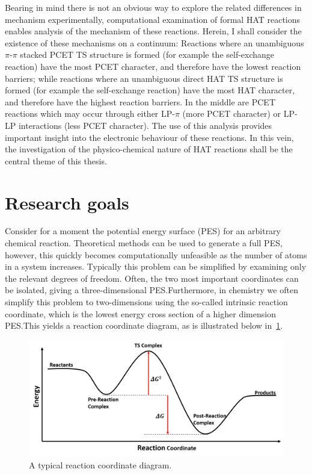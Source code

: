 Bearing in mind there is not an obvious way to explore the related differences
in mechanism experimentally, computational examination of formal HAT reactions
enables analysis of the mechanism of these reactions. Herein, I shall consider
the existence of these mechanisms on a continuum: Reactions where an unambiguous
$\pi$-$\pi$ stacked PCET TS structure is formed (for example the  self-exchange reaction) have the most PCET character, and therefore have
the lowest reaction barriers; while reactions where an unambiguous direct HAT TS
structure is formed (for example the  self-exchange reaction)
have the most HAT character, and therefore have the highest reaction barriers.
In the middle are PCET reactions which may occur through either LP-$\pi$ (more
PCET character) or LP-LP interactions (less PCET character). The use of this
analysis provides important insight into the electronic behaviour of these
reactions. In this vein, the investigation of the physico-chemical nature of HAT
reactions shall be the central theme of this thesis.

\section{Research goals}

Consider for a moment the potential energy surface (PES) for an arbitrary
chemical reaction. Theoretical methods can be used to generate a full PES,
however, this quickly becomes computationally unfeasible as the number of atoms
in a system increases. Typically this problem can be simplified by examining
only the relevant degrees of freedom. Often, the two most important coordinates
can be isolated, giving a three-dimensional PES.\@ Furthermore, in chemistry we
often simplify this problem to two-dimensions using the so-called intrinsic
reaction coordinate, which is the lowest energy cross section of a higher
dimension PES.\@ This yields a reaction coordinate diagram, as is illustrated
below in~\ref{fig:pes}.

\begin{figure}[htb]
  \centering
  \includegraphics[width=\textwidth]{figures/pes}
  \caption[A typical reaction coordinate diagram.]{A typical reaction
  coordinate diagram.}
\label{fig:pes}
\end{figure}

